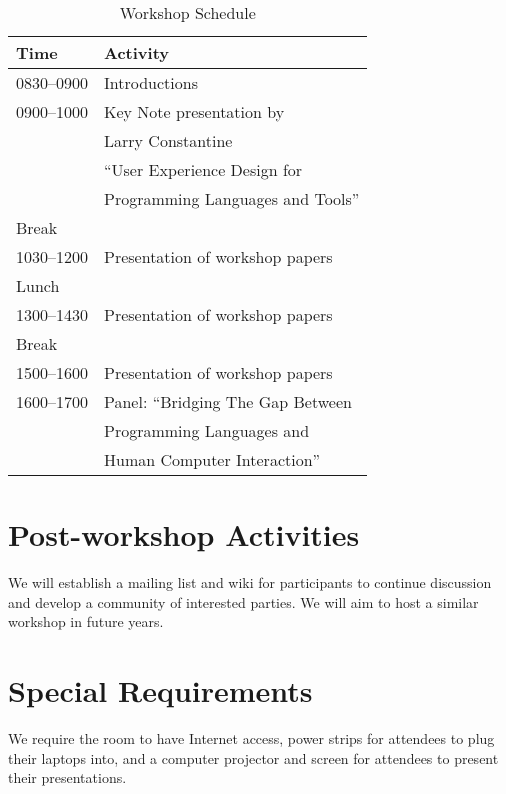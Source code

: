 \documentclass{acm_proc_article-sp}
\begin{document}
\begin{table} [!htbp] %
\begin{tabularx}{\columnwidth}{l|X}
\textbf{Time}   & \textbf{Activity} \\
\hline
0830--0900    & Introductions \vspace{1mm} \\
0900--1000    & Key Note presentation by \\
                & Larry Constantine\\
                & ``User Experience Design for \\
                & Programming Languages and Tools'' \vspace{1mm} \\
Break              & ~\vspace{1mm}\\
1030--1200   & Presentation of workshop papers \vspace{1mm}\\
Lunch             & ~\vspace{1mm}\\
1300--1430   & Presentation of workshop papers \vspace{1mm}\\
Break              & ~\vspace{1mm}\\
1500--1600    & Presentation of workshop papers \vspace{1mm}\\
1600--1700    & Panel: ``Bridging The Gap Between\\
                     & Programming Languages and\\
                     & Human Computer Interaction'' \\

\end{tabularx}
\caption{Workshop Schedule}
\label{tab:schedule}
\end{table}

\section{Post-workshop Activities}

We will establish a mailing list and wiki for participants 
to continue discussion and develop a community of 
interested parties. 
We will aim to host a similar workshop in future years.

\section{Special Requirements}

We require the room to have Internet access, power strips for 
attendees to plug their laptops into, and a computer projector 
and screen for attendees to present their presentations.

% 
%  
\end{document}
